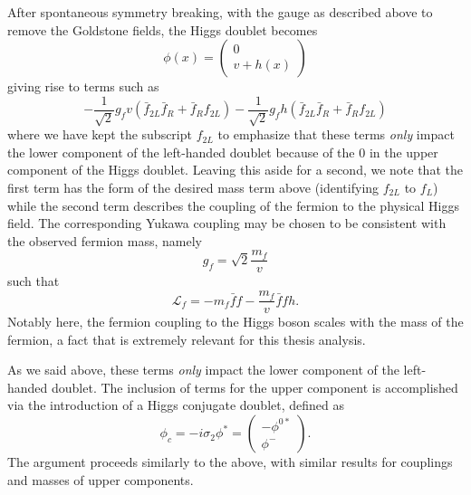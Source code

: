 After spontaneous symmetry breaking, with the gauge as described above to remove the Goldstone fields, 
the Higgs doublet becomes 
\begin{equation}
\phi(x) = \begin{pmatrix}0\\v+h(x)\end{pmatrix}
\end{equation}
giving rise to terms such as
\begin{equation}
-\frac{1}{\sqrt{2}}g_{f}v(\bar{f}_{2L}\bar{f}_R + \bar{f}_Rf_{2L}) -\frac{1}{\sqrt{2}}g_{f}h(\bar{f}_{2L}\bar{f}_R + \bar{f}_Rf_{2L}) 
\end{equation}
where we have kept the subscript $f_{2L}$ to emphasize that these terms \emph{only} impact the lower component 
of the left-handed doublet because of the $0$ in the upper component of the Higgs doublet. Leaving this aside 
for a second, we note that the first term has the form of the desired mass term above (identifying $f_{2L}$ to $f_L$)
while the second term describes the coupling of the fermion to the physical Higgs field. The corresponding Yukawa 
coupling may be chosen to be consistent with the observed fermion mass, namely
\begin{equation}
g_{f} = \sqrt{2}\frac{m_f}{v}
\end{equation}
such that
\begin{equation}
\mathcal{L}_f = -m_{f}\bar{f}f -\frac{m_{f}}{v}\bar{f}fh.
\end{equation}
Notably here, the fermion coupling to the Higgs boson scales with the mass of the fermion, a fact that is 
extremely relevant for this thesis analysis.

As we said above, these terms \emph{only} impact the lower component of the left-handed doublet. The inclusion 
of terms for the upper component is accomplished via the introduction of a Higgs conjugate doublet, defined as
\begin{equation}
\phi_c = -i\sigma_2\phi^{*} = \begin{pmatrix}-\phi^{0*}\\ \phi^{-}\end{pmatrix}.
\end{equation}
The argument proceeds similarly to the above, with similar results for couplings and masses of upper 
components.

